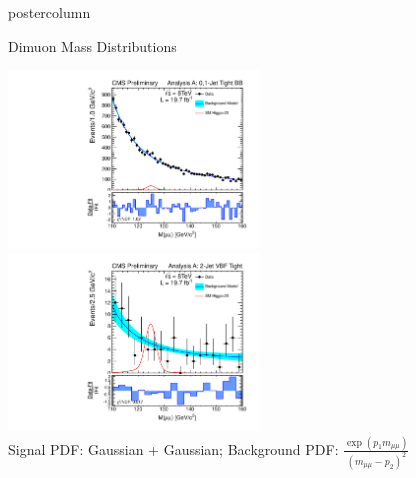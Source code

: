 \documentclass[final,hyperref={pdfpagelabels=false}]{beamer}
\newlength{\columnheight}
\begin{document}
\begin{frame}
\begin{columns}
    \begin{column}{.49\textwidth}
      \begin{beamercolorbox}[center,wd=\textwidth]{postercolumn}
        \begin{minipage}[T]{.95\textwidth} %
          \parbox[t][\columnheight]{\textwidth}{ %
            \begin{block}{Dimuon Mass Distributions}
              \begin{center}
                \includegraphics[width=0.5\textwidth]{plotsPublic/mass_AnanlysisA/pdf/CombSplitAll_8TeV_125_Jets01PassPtG10BB.pdf}
                \includegraphics[width=0.5\textwidth]{plotsPublic/mass_AnanlysisA/pdf/CombSplitAll_8TeV_125_Jet2CutsVBFPass.pdf}
              \\
              Signal PDF: Gaussian + Gaussian; Background PDF: $\frac{\exp(p_1 m_{\mu\mu})}{(m_{\mu\mu}-p_2)^2}$

\end{center}
\end{block}}
\end{minipage}
\end{beamercolorbox}
\end{column}
\end{columns}
\end{frame}
\end{document}
